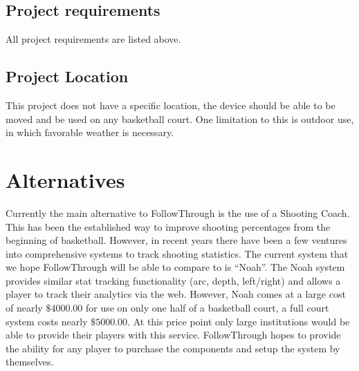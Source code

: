 \subsection{Project requirements}
\hspace*{4mm}All project requirements are listed above. 

\subsection{Project Location}
\hspace*{4mm}This project does not have a specific location, the device should be able to be moved and be used on any basketball court. One limitation to this is outdoor use, in which favorable weather is necessary.

\section{Alternatives}
\hspace*{4mm}Currently the main alternative to FollowThrough is the use of a Shooting Coach. This has been the established way to improve shooting percentages from the beginning of basketball. However, in recent years there have been a few ventures into comprehensive systems to track shooting statistics. The current system that we hope FollowThrough will be able to compare to is “Noah”. The Noah system provides similar stat tracking functionality (arc, depth, left/right) and allows a player to track their analytics via the web. However, Noah comes at a large cost of nearly $\$4000.00$ for use on only  one half of a basketball court, a full court system costs nearly $\$5000.00$. At this price point only large institutions would be able to provide their players with this service. FollowThrough hopes to provide the ability for any player to purchase the components and setup the system by themselves. 